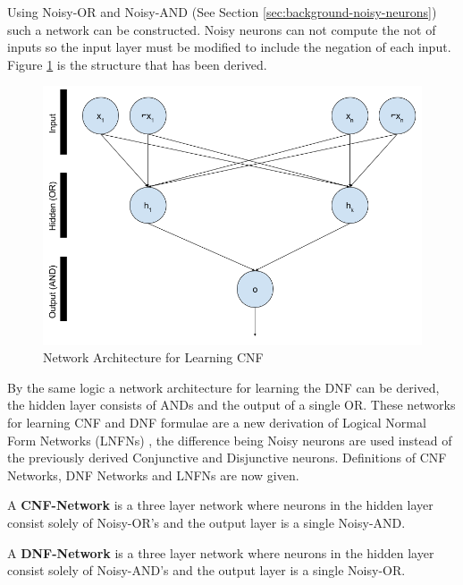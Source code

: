 Using Noisy-OR and Noisy-AND (See Section \ref{sec:background-noisy-neurons}) such a network can be constructed. Noisy neurons can not compute the not of inputs so the input layer must be modified to include the negation of each input. Figure \ref{fig:cnf-network-structure} is the structure that has been derived.

\begin{figure}[H]
	\centering
	\begin{minipage}[b]{0.6\textwidth}
		\includegraphics[width=\textwidth]{CNF-Network-Structure.png}
		\caption{Network Architecture for Learning CNF}
		\label{fig:cnf-network-structure}
	\end{minipage}
	\hfill
\end{figure}

By the same logic a network architecture for learning the DNF can be derived, the hidden layer consists of ANDs and the output of a single OR. These networks for learning CNF and DNF formulae are a new derivation of Logical Normal Form Networks (LNFNs) \cite{herrmann1996backpropagation}, the difference being Noisy neurons are used instead of the previously derived Conjunctive and Disjunctive neurons. Definitions of CNF Networks, DNF Networks and LNFNs are now given.

\theoremstyle{definition}
\begin{definition} \label{def:cnf-network}
A \textbf{CNF-Network} is a three layer network where neurons in the hidden layer consist solely of Noisy-OR's and the output layer is a single Noisy-AND. 
\end{definition}

\theoremstyle{definition}
\begin{definition} \label{def:dnf-network}
A \textbf{DNF-Network} is a three layer network where neurons in the hidden layer consist solely of Noisy-AND's and the output layer is a single Noisy-OR. 
\end{definition}

